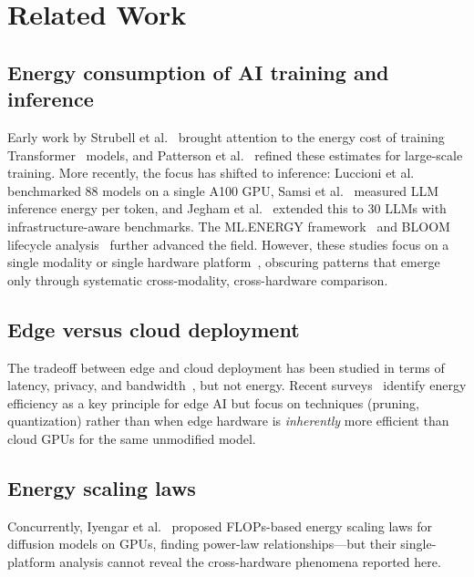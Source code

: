 \documentclass[preprint,12pt]{elsarticle}
\begin{document}
\section{Related Work}
\label{sec:related}

\subsection{Energy consumption of AI training and inference}

Early work by Strubell et al.~\cite{strubell2019energy} brought attention to the energy cost of training Transformer~\cite{vaswani2017attention} models, and Patterson et al.~\cite{patterson2021carbon} refined these estimates for large-scale training. More recently, the focus has shifted to inference: Luccioni et al.~\cite{luccioni2024power} benchmarked 88 models on a single A100 GPU, Samsi et al.~\cite{samsi2023words} measured LLM inference energy per token, and Jegham et al.~\cite{jegham2025hungry} extended this to 30 LLMs with infrastructure-aware benchmarks. The ML.ENERGY framework~\cite{you2023zeus} and BLOOM lifecycle analysis~\cite{luccioni2023bloom} further advanced the field. However, these studies focus on a single modality or single hardware platform~\cite{dodge2022measuring}, obscuring patterns that emerge only through systematic cross-modality, cross-hardware comparison.

\subsection{Edge versus cloud deployment}

The tradeoff between edge and cloud deployment has been studied in terms of latency, privacy, and bandwidth~\cite{mao2024green,xu2024edge}, but not energy. Recent surveys~\cite{mao2024green} identify energy efficiency as a key principle for edge AI but focus on techniques (pruning, quantization) rather than when edge hardware is \textit{inherently} more efficient than cloud GPUs for the same unmodified model.

\subsection{Energy scaling laws}

Concurrently, Iyengar et al.~\cite{castano2025energy} proposed FLOPs-based energy scaling laws for diffusion models on GPUs, finding power-law relationships---but their single-platform analysis cannot reveal the cross-hardware phenomena reported here.
\end{document}
